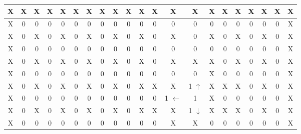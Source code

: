 			
			\begin{center}
				\begin{tabular}{|c|c|c|c|c|c|c|c|c|c|c|c|c|c|c|c|c|c|c|c|c|} \hline
				\rowcolor{cyan} X & X & X & X & X & X & X & X & X & X & X & X & X & X & X & X & X & X & X & X & X \\\hline
				\cellcolor{cyan}X & 0 & 0 & 0 & 0 & 0 & 0 & 0 & 0 & 0 & 0 & 0 & 0 & 0 & 0 & 0 & 0 & 0 & 0 & 0 & \cellcolor{cyan}X \\\hline
				\cellcolor{cyan}X & 0 & \cellcolor{cyan}\cellcolor{cyan}X & 0 & \cellcolor{cyan}X & 0 & \cellcolor{cyan}X & 0 & \cellcolor{cyan}X & 0 & \cellcolor{cyan}X & 0 & \cellcolor{cyan}X & 0 & \cellcolor{cyan}X &0 & \cellcolor{cyan}X & 0 & \cellcolor{cyan}X & 0 & \cellcolor{cyan}X \\\hline
				\cellcolor{cyan}X & 0 & 0 & 0 & 0 & 0 & 0 & 0 & 0 & 0 & 0 & 0 & 0 & 0 & 0 & 0 & 0 & 0 & 0 & 0 & \cellcolor{cyan}X \\\hline
				\cellcolor{cyan}X & 0 & \cellcolor{cyan}X & 0 & \cellcolor{cyan}X & 0 & \cellcolor{cyan}X & 0 & \cellcolor{cyan}X & 0 & \cellcolor{cyan}X & 0 & \cellcolor{cyan}X & \cellcolor{cyan}X & \cellcolor{cyan}X & 0 & \cellcolor{cyan}X & 0 & \cellcolor{cyan}X & 0 & \cellcolor{cyan}X \\\hline
				\cellcolor{cyan}X & 0 & 0 & 0 & 0 & 0 & 0 & 0 & 0 & 0 & 0 & 0 & 0 & 0 & \cellcolor{cyan}X & 0 & 0 & 0 & 0 & 0 & \cellcolor{cyan}X \\\hline
				\cellcolor{cyan}X & 0 & \cellcolor{cyan}X & 0 & \cellcolor{cyan}X & 0 & \cellcolor{cyan}X & 0 & \cellcolor{cyan}X & 0 & \cellcolor{cyan}X & \cellcolor{cyan}X & \cellcolor{cyan}X & \cellcolor{orange}1 $\uparrow$ & \cellcolor{cyan}X & \cellcolor{cyan}X & \cellcolor{cyan}X & 0 & \cellcolor{cyan}X & 0 & \cellcolor{cyan}X \\\hline
				\cellcolor{cyan}X & 0 & 0 & 0 & 0 & 0 & 0 & 0 & 0 & 0 & 0 & 0 & \cellcolor{orange}1 $\leftarrow$ & \cellcolor{orange}1 & \cellcolor{gray}X & 0 & 0 & 0 & 0 & 0 & \cellcolor{cyan}X \\\hline
				\cellcolor{cyan}X & 0 & \cellcolor{cyan}X & 0 & \cellcolor{cyan}X & 0 & \cellcolor{cyan}X & 0 & \cellcolor{cyan}X & 0 & \cellcolor{cyan}X & \cellcolor{cyan}X & \cellcolor{cyan}X & \cellcolor{orange}1 $\downarrow$ & \cellcolor{cyan}X & \cellcolor{cyan}X & \cellcolor{cyan}X & 0 & \cellcolor{cyan}X & 0 & \cellcolor{cyan}X \\\hline
				\cellcolor{cyan}X & 0 & 0 & 0 & 0 & 0 & 0 & 0 & 0 & 0 & 0 & 0 & \cellcolor{cyan}X & \cellcolor{gray}X & 0 & 0 & 0 & 0 & 0 & 0 & \cellcolor{cyan}X \\\hline

\end{tabular}
\end{center}
